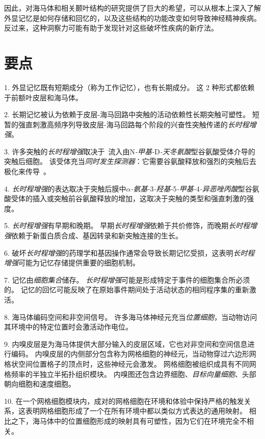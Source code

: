 因此，对海马体和相关颞叶结构的研究提供了巨大的希望，可以从根本上深入了解外显记忆是如何存储和回忆的，以及这些结构的功能改变如何导致神经精神疾病。
反过来，这种洞察力可能有助于发现针对这些破坏性疾病的新疗法。



\section{要点}

1. 外显记忆既有短期成分（称为工作记忆），也有长期成分。
这 2 种形式都依赖于前额叶皮层和海马体。


2. 长期记忆被认为依赖于皮层-海马回路中突触的活动依赖性长期突触可塑性。
短暂的强直刺激高频序列导致皮层-海马回路每个阶段的兴奋性突触传递的\textit{长时程增强}。


3. 许多突触的\textit{长时程增强}取决于~流入由N\textit{-甲基-}D\textit{-天冬氨酸}型谷氨酸受体介导的突触后细胞。
该受体充当\textit{同时发生探测器}：它需要谷氨酸释放和强烈的突触后去极化来传导~。


4. \textit{长时程增强}的表达取决于突触后膜中\textit{$\alpha$-氨基-}3\textit{-羟基-}5\textit{-甲基-}4\textit{-异恶唑丙酸}型谷氨酸受体的插入或突触前谷氨酸释放的增加，这取决于突触的类型和强直刺激的强度。


5. \textit{长时程增强}有早期和晚期。
早期\textit{长时程增强}依赖于共价修饰，而晚期\textit{长时程增强}依赖于新蛋白质合成、基因转录和新突触连接的生长。


6. 破坏\textit{长时程增强}的药理学和基因操作通常会导致长期记忆受损，这表明\textit{长时程增强}可能为记忆存储提供重要的细胞机制。


7. 记忆由\textit{细胞集合}储存。
\textit{长时程增强}可能是形成特定于事件的细胞集合所必须的。
记忆的回忆可能反映了在原始事件期间处于活动状态的相同程序集的重新激活。


8. 海马体编码空间和非空间信号。
许多海马体神经元充当\textit{位置细胞}，当动物访问其环境中的特定位置时会激活动作电位。


9. 内嗅皮层是为海马体提供大部分输入的皮层区域，它也对非空间和空间信息进行编码。
内嗅皮层的内侧部分包含称为网格细胞的神经元，当动物穿过六边形网格状空间位置格子的顶点时，这些神经元会激发。
网格细胞被组织成具有不同网格频率的半独立半拓扑组织模块。
内嗅图还包含边界细胞、\textit{目标向量细胞}、头部朝向细胞和速度细胞。


10. 在一个网格细胞模块内，成对的网格细胞在环境和体验中保持严格的触发关系，这表明网格细胞形成了一个在所有环境中都以类似方式表达的通用映射。
相比之下，海马体中的位置细胞形成的映射具有可塑性，因为它们在环境完全不相关。


